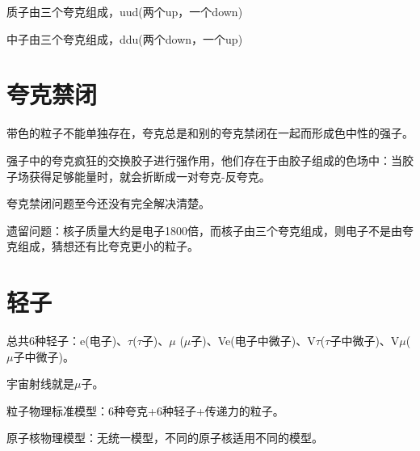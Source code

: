 质子由三个夸克组成，uud(两个up，一个down)

中子由三个夸克组成，ddu(两个down，一个up)

\section{夸克禁闭}

带色的粒子不能单独存在，夸克总是和别的夸克禁闭在一起而形成色中性的强子。

强子中的夸克疯狂的交换胶子进行强作用，他们存在于由胶子组成的色场中：当胶子场获得足够能量时，就会折断成一对夸克-反夸克。

夸克禁闭问题至今还没有完全解决清楚。

遗留问题：核子质量大约是电子1800倍，而核子由三个夸克组成，则电子不是由夸克组成，猜想还有比夸克更小的粒子。

\section{轻子}

总共6种轻子：e(电子)、$\tau$($\tau$子)、$\mu$ ($\mu$子)、Ve(电子中微子)、V$\tau$($\tau$子中微子)、V$\mu$($\mu$子中微子)。

宇宙射线就是$\mu$子。

粒子物理标准模型：6种夸克+6种轻子+传递力的粒子。

原子核物理模型：无统一模型，不同的原子核适用不同的模型。

\clearpage
